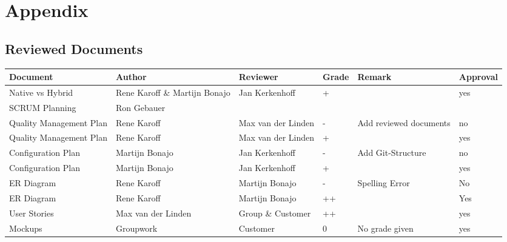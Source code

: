 \begin{sidewaystable}
	\section*{Appendix}
	\subsection*{Reviewed Documents}
		\begin{longtable}[htbp]{ l p{3.7cm} *{2}{l} p{3.7cm} l}
			\textbf{Document} & \textbf{Author} & \textbf{Reviewer} & \textbf{Grade} & \textbf{Remark} & \textbf{Approval}\\ \hline
			Native vs Hybrid & Rene Karoff \& Martijn Bonajo & Jan Kerkenhoff &+& & yes\\
			SCRUM Planning & Ron Gebauer & & & & \\
			Quality Management Plan & Rene Karoff & Max van der Linden &-&  Add reviewed documents& no \\
			Quality Management Plan & Rene Karoff & Max van der Linden &+& & yes \\
			Configuration Plan & Martijn Bonajo & Jan Kerkenhoff &-& Add Git-Structure & no\\
			Configuration Plan & Martijn Bonajo & Jan Kerkenhoff &+&  & yes\\
			ER Diagram & Rene Karoff & Martijn Bonajo & - & Spelling Error& No\\
			ER Diagram & Rene Karoff & Martijn Bonajo &++&& Yes\\
			User Stories & Max van der Linden & Group \& Customer & ++ & & yes \\
			Mockups & Groupwork & Customer & 0 & No grade given &  yes\\
		\end{longtable}
\end{sidewaystable}